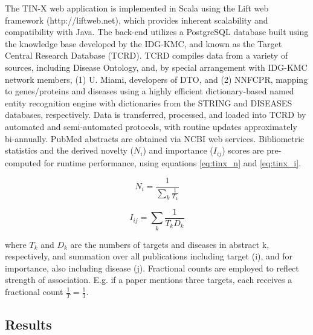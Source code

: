 The TIN-X web application is implemented in Scala using the Lift web framework (http://liftweb.net), which provides inherent scalability and compatibility with Java.  The back-end utilizes a PostgreSQL database built using the knowledge base developed by the IDG-KMC, and known as the Target Central Research Database (TCRD)\cite{Nguyen2017-lo}.  TCRD compiles data from a variety of sources, including Disease Ontology, and, by special arrangement with IDG-KMC network members, (1) U. Miami, developers of DTO, and (2) NNFCPR, mapping to genes/proteins and diseases using a highly efficient dictionary-based named entity recognition engine\cite{Pafilis2013-ml} with dictionaries from the STRING\cite{Szklarczyk2015-bl} and DISEASES\cite{Pletscher-Frankild2015-oo} databases, respectively.  Data is transferred, processed, and loaded into TCRD by automated and semi-automated protocols, with routine updates approximately bi-annually.  PubMed abstracts are obtained via NCBI web services.  Bibliometric statistics and the derived novelty ($N_i$) and importance ($I_{ij}$) scores are pre-computed for runtime performance, using equations \ref{eq:tinx_n} and \ref{eq:tinx_i}.

\begin{equation}
N_i = \frac{1}{\sum_{k}^{}\frac{1}{T_k}}
\label{eq:tinx_n}
\end{equation}

\begin{equation}
I_{ij} = \sum_{k}^{}\frac{1}{T_kD_k}
\label{eq:tinx_i}
\end{equation}

where $T_k$ and $D_k$ are the numbers of targets and diseases in abstract k, respectively, and summation over all publications including target (i), and for importance, also including disease (j). Fractional counts are employed to reflect strength of association.  E.g. if a paper mentions three targets, each receives a fractional count $\frac{1}{T} = \frac{1}{3}$.

\subsection{Results}

